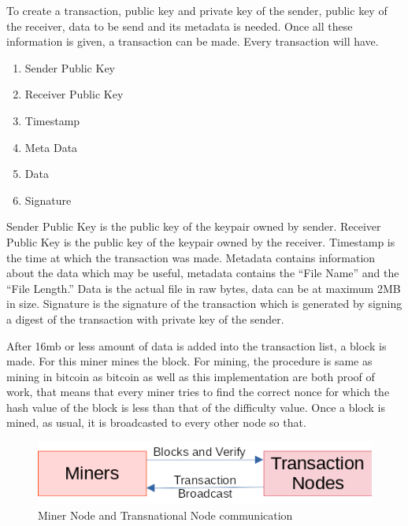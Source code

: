 \documentclass[conference]{IEEEtran}
\begin{document}
To create a transaction, public key and private key of the sender, public key of the receiver, data to be send and its metadata is needed. Once all these information is given, a transaction can be made. Every transaction will have. 
\begin{enumerate}
	\item Sender Public Key 
	
	\item Receiver Public Key 
	
	\item Timestamp 
	
	\item Meta Data 
	
	\item Data 
	
	\item Signature 
\end{enumerate}
Sender Public Key is the public key of the keypair owned by sender. Receiver Public Key is the public key of the keypair owned by the receiver. Timestamp is the time at which the transaction was made. Metadata contains information about the data which may be useful, metadata contains the “File Name” and the “File Length.” Data is the actual file in raw bytes, data can be at maximum 2MB in size. Signature is the signature of the transaction which is generated by signing a digest of the transaction with private key of the sender.

After 16mb or less amount of data is added into the transaction list, a block is made. For this miner mines the block. For mining, the procedure is same as mining in bitcoin as bitcoin as well as this implementation are both proof of work, that means that every miner tries to find the correct nonce for which the hash value of the block is less than that of the difficulty value. Once a block is mined, as usual, it is broadcasted to every other node so that.  

\begin{figure}[h!]
	\centering
	\includegraphics[width=0.7\linewidth]{BlockBroadCast}
	\caption{Miner Node and Transnational Node communication}
	\label{fig:blockbroadcast}
\end{figure}
\end{document}
